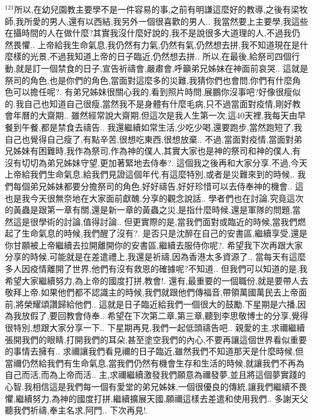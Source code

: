 \documentclass{book}
\begin{document}
$^{121}$所以,在幼兒園教主要學不是一件容易的事,之前有明謙這麼好的教導,之後有梁牧師,我所愛的男人,還有以西結,我另外一個很喜歡的男人..
我當然要上主要學,我這些在攝時間的人在做什麼?其實我沒什麼好說的,我不是說很多大道理的人,不過我仍然畏懼..
上帝給我生命氣息,我仍然有力氣,仍然有氣,仍然想去拼,我不知道現在是什麼樣的光景,不過我知道上帝的日子臨近,仍然想去拼..
所以,在最後,給祭司四個行動,就是訂一個禁食的日子,宣告祈禱會,嚴肅會,呼籲弟兄姊妹在神面前哀哭..
這就是祭司的角色,也是你們的角色,當面對這麼多的災難,我猜你們也會問,你們有什麼角色可以擔任呢?.
有弟兄姊妹很關心我的,看到照片時問,展鵬你沒事吧?好像很瘦似的.我自己也知道自己很瘦,當然我不是身體有什麼毛病,只不過當面對疫情,剛好教會年曆的大齋期..
雖然經常說大齋期,但這次是我人生第一次,這40天裡,我每天由早餐到午餐,都是禁食去禱告..
我還繼續如常生活,少吃少喝,還要跑步,當然跑短了,我自己也覺得自己瘦了,有點辛苦,很想吃東西,很想放棄..
不過,當面對疫情,當面對弟兄姊妹有困難時,我作為祭司,作為神的僕人,其實大家也是神的祭司和神的僕人,有沒有切切為弟兄姊妹守望,更加著緊地去侍奉?.
這個我之後再和大家分享.不過,今天上帝給我們生命氣息,給我們見證這個年代,有這麼特別,或者是災難來到的時候,.
我們每個弟兄姊妹都要分擔祭司的角色,好好禱告,好好珍惜可以去侍奉神的機會..
這也是我今天很無奈地在大家面前獻醜,分享的觀念說話..
學者們也在討論,究竟這次的黃蟲是跟第一章有關,還是新一章的黃蟲之災,是指什麼時候,還是軍隊的問題,當然這是很學術的討論,值得討論..
但更實際的是,當我們面對或臨近的時候,當我們燃起了生命氣息的時候,我們醒了沒有?.
是否只是沈醉在自己的安書區,繼續享受,還是你甘願被上帝繼續去拉開離開你的安書區,繼續去服侍你呢?.
希望我下次再跟大家分享的時候,可能就是在差遣禮上,我還是祈禱,因為香港太多資源了..
當每天有這麼多人因疫情離開了世界,他們有沒有救恩的確據呢?不知道..
但我們可以知道的是,我希望大家繼續努力,為上帝的國度打拼,教會!.
還有,最重要的一個職份,就是要帶人去敬拜上帝.如果他們都不認識主的時候,我們就跟他們傳福音,帶領萬國萬民去上帝面前,將榮耀頌讚歸給他們..
這就是日子臨近給我們一個很大的鼓勵.下星期是六播,因為我放假了,要回教會侍奉..
希望在下次第二章,第三章,聽到李思敬博士的分享,覺得很特別,想跟大家分享一下..
下星期再見,我們一起低頭禱告吧..
親愛的主,求禰繼續張開我們的眼睛,打開我們的耳朵,甚至塗空我們的內心,不要再讓這個世界看似重要的事情去擁有..
求禰讓我們看見禰的日子臨近,雖然我們不知道那天是什麼時候,但當禰仍然給我們有生命氣息,當我們仍然有機會生存和生活的時候,就讓我們不再為自己而活,而為上帝而活..
主,求禰繼續激發我們願意為禰發夢,並且將這個夢實踐的心智.我相信這是我們每一個有愛堂的弟兄姊妹,一個很優良的傳統,讓我們繼續不畏懼,繼續努力,為神的國度打拼,繼續擴展天國,願禰這樣去差遣和使用我們..
多謝天父聽我們祈禱,奉主名求,阿門..
下次再見!.
\newpage
\end{document}
